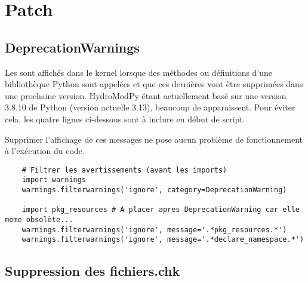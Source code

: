 
\chapter{Patch}
\label{chap:patch}

\minitableofcontents

\newpage


\section{DeprecationWarnings}
\label{sec:deprecationwarnings}

Les  sont affichés dans le kernel lorsque des méthodes ou définitions d'une bibliothèque Python sont appelées et que ces dernières vont être supprimées dans une prochaine version. HydroModPy étant actuellement basé sur une version 3.8.10 de Python (version actuelle 3.13), beaucoup de  apparaissent. Pour éviter cela, les quatre lignes ci-dessous sont à inclure en début de script. 

\begin{InfoBox}
    Supprimer l'affichage de ces messages ne pose aucun problème de fonctionnement à l'exécution du code.
\end{InfoBox}

\begin{verbatim}
    # Filtrer les avertissements (avant les imports)
    import warnings
    warnings.filterwarnings('ignore', category=DeprecationWarning)

    import pkg_resources # A placer apres DeprecationWarning car elle meme obsolète...
    warnings.filterwarnings('ignore', message='.*pkg_resources.*')
    warnings.filterwarnings('ignore', message='.*declare_namespace.*')
\end{verbatim}

\section{Suppression des fichiers.chk}
\label{sec:suppression_fichiers_chk}


